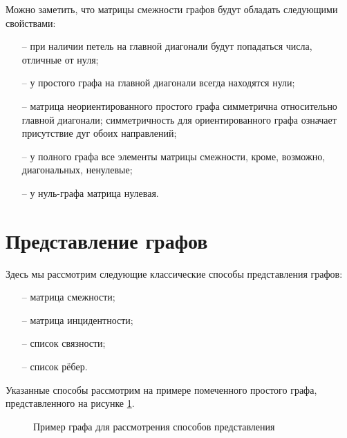 Можно заметить, что матрицы смежности графов будут обладать следующими 
свойствами:

\begin{itemize}
	\item[--] при наличии петель на главной диагонали будут попадаться числа, 
	отличные от нуля;
	\item[--] у простого графа на главной диагонали всегда находятся нули;
	\item[--] матрица неориентированного простого графа симметрична относительно
	главной диагонали; симметричность для ориентированного графа означает
	присутствие дуг обоих направлений;
	\item[--] у полного графа все элементы матрицы смежности, кроме, возможно,
	диагональных, ненулевые;
	\item[--] у нуль-графа матрица нулевая.
\end{itemize}

\section{Представление графов}

Здесь мы рассмотрим следующие классические способы представления графов:
\begin{itemize}
	\item[--] матрица смежности;
	\item[--] матрица инцидентности;
	\item[--] список связности;
	\item[--] список рёбер.
\end{itemize}

Указанные способы рассмотрим на примере помеченного простого графа, 
представленного на рисунке \ref{example of a graph}.

\begin{figure}[h]
	\center
	\caption{Пример графа для рассмотрения способов представления}
	\label{example of a graph}
\end{figure}

